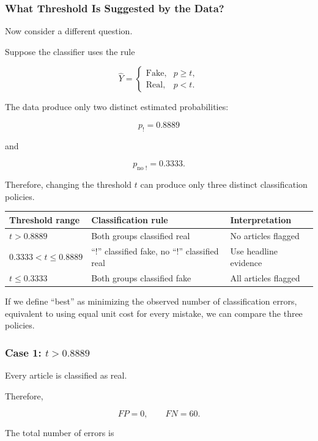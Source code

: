 \documentclass[11pt]{article}
\begin{document}
\subsubsection*{What Threshold Is Suggested by the Data?}

Now consider a different question.

Suppose the classifier uses the rule

\[
\hat{Y}
=
\begin{cases}
\text{Fake}, & p\geq t,\\
\text{Real}, & p<t.
\end{cases}
\]

The data produce only two distinct estimated probabilities:

\[
p_{!}=0.8889
\]

and

\[
p_{\text{no }!}=0.3333.
\]

Therefore, changing the threshold $t$ can produce only three distinct
classification policies.

\begin{center}
\begin{tabular}{lll}
\toprule
Threshold range & Classification rule & Interpretation \\
\midrule
$t>0.8889$
&
Both groups classified real
&
No articles flagged
\\[4pt]

$0.3333<t\leq0.8889$
&
``!'' classified fake, no ``!'' classified real
&
Use headline evidence
\\[4pt]

$t\leq0.3333$
&
Both groups classified fake
&
All articles flagged
\\
\bottomrule
\end{tabular}
\end{center}

If we define ``best'' as minimizing the observed number of classification
errors, equivalent to using equal unit cost for every mistake, we can compare
the three policies.

\subsubsection*{Case 1: $t>0.8889$}

Every article is classified as real.

Therefore,

\[
FP=0,
\qquad
FN=60.
\]

The total number of errors is
\end{document}
